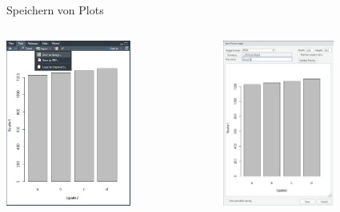 \documentclass[xcolor=dvipsnames, aspectratio = 169]{beamer}
\begin{document}
\begin{frame}[fragile]{Speichern von Plots}
	\begin{columns}[T]
		\begin{column}{0.5\textwidth}
			\begin{center}
				\includegraphics[height=5.5cm]{SaveImage}
			\end{center}
		\end{column}
		\begin{column}{0.5\textwidth}
			\begin{center}
				\includegraphics[height=5.5cm]{SaveImage2}
			\end{center}
		\end{column}
	\end{columns}	
\end{frame}
\end{document}

